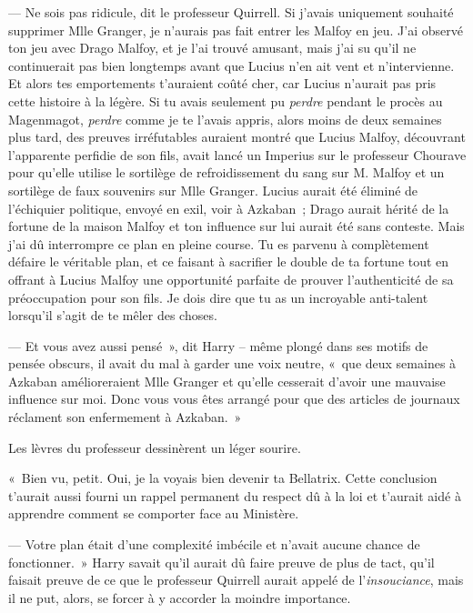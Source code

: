 --- Ne sois pas ridicule, dit le professeur Quirrell. Si j'avais uniquement souhaité supprimer Mlle Granger, je n'aurais pas fait entrer les Malfoy en jeu. J'ai observé ton jeu avec Drago Malfoy, et je l'ai trouvé amusant, mais j'ai su qu'il ne continuerait pas bien longtemps avant que Lucius n'en ait vent et n'intervienne. Et alors tes emportements t'auraient coûté cher, car Lucius n'aurait pas pris cette histoire à la légère. Si tu avais seulement pu \emph{perdre} pendant le procès au Magenmagot, \emph{perdre} comme je te l'avais appris, alors moins de deux semaines plus tard, des preuves irréfutables auraient montré que Lucius Malfoy, découvrant l'apparente perfidie de son fils, avait lancé un Imperius sur le professeur Chourave pour qu'elle utilise le sortilège de refroidissement du sang sur M. Malfoy et un sortilège de faux souvenirs sur Mlle Granger. Lucius aurait été éliminé de l'échiquier politique, envoyé en exil, voir à Azkaban~; Drago aurait hérité de la fortune de la maison Malfoy et ton influence sur lui aurait été sans conteste. Mais j'ai dû interrompre ce plan en pleine course. Tu es parvenu à complètement défaire le véritable plan, et ce faisant à sacrifier le double de ta fortune tout en offrant à Lucius Malfoy une opportunité parfaite de prouver l'authenticité de sa préoccupation pour son fils. Je dois dire que tu as un incroyable anti-talent lorsqu'il s'agit de te mêler des choses.

--- Et vous avez aussi pensé~», dit Harry -- même plongé dans ses motifs de pensée obscurs, il avait du mal à garder une voix neutre, «~que deux semaines à Azkaban amélioreraient Mlle Granger et qu'elle cesserait d'avoir une mauvaise influence sur moi. Donc vous vous êtes arrangé pour que des articles de journaux réclament son enfermement à Azkaban.~»

Les lèvres du professeur dessinèrent un léger sourire.

«~Bien vu, petit. Oui, je la voyais bien devenir ta Bellatrix. Cette conclusion t'aurait aussi fourni un rappel permanent du respect dû à la loi et t'aurait aidé à apprendre comment se comporter face au Ministère.

--- Votre plan était d'une complexité imbécile et n'avait aucune chance de fonctionner.~» Harry savait qu'il aurait dû faire preuve de plus de tact, qu'il faisait preuve de ce que le professeur Quirrell aurait appelé de l'\emph{insouciance}, mais il ne put, alors, se forcer à y accorder la moindre importance.

